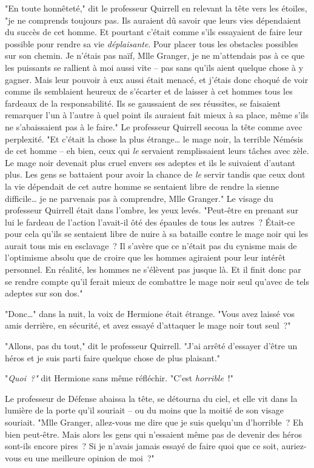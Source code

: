 "En toute honnêteté," dit le professeur Quirrell en relevant la tête vers les étoiles, "je ne comprends toujours pas. Ils auraient dû savoir que leurs vies dépendaient du succès de cet homme. Et pourtant c'était comme s'ils essayaient de faire leur possible pour rendre sa vie \emph{déplaisante}. Pour placer tous les obstacles possibles sur son chemin. Je n'étais pas naïf, Mlle Granger, je ne m'attendais pas à ce que les puissants se rallient à moi aussi vite -- pas sans qu'ils aient quelque chose à y gagner. Mais leur pouvoir à eux aussi était menacé, et j'étais donc choqué de voir comme ils semblaient heureux de s'écarter et de laisser à cet hommes tous les fardeaux de la responsabilité. Ils se gaussaient de ses réussites, se faisaient remarquer l'un à l'autre à quel point ils auraient fait mieux à sa place, même s'ils ne s'abaissaient pas à le faire." Le professeur Quirrell secoua la tête comme avec perplexité. "Et c'était la chose la plus étrange… le mage noir, la terrible Némésis de cet homme -- eh bien, ceux qui \emph{le} servaient remplissaient leurs tâches avec zèle. Le mage noir devenait plus cruel envers ses adeptes et ils le suivaient d'autant plus. Les gens se battaient pour avoir la chance de \emph{le} servir tandis que ceux dont la vie dépendait de cet autre homme se sentaient libre de rendre la sienne difficile… je ne parvenais pas à comprendre, Mlle Granger." Le visage du professeur Quirrell était dans l'ombre, les yeux levés. "Peut-être en prenant sur lui le fardeau de l'action l'avait-il ôté des épaules de tous les autres~? Était-ce pour cela qu'ils se sentaient libre de nuire à sa bataille contre le mage noir qui les aurait tous mis en esclavage~? Il s'avère que ce n'était pas du cynisme mais de l'optimisme absolu que de croire que les hommes agiraient pour leur intérêt personnel. En réalité, les hommes ne s'élèvent pas jusque là. Et il finit donc par se rendre compte qu'il ferait mieux de combattre le mage noir seul qu'avec de tels adeptes sur son dos."

"Donc…" dans la nuit, la voix de Hermione était étrange. "Vous avez laissé vos amis derrière, en sécurité, et avez essayé d'attaquer le mage noir tout seul~?"

"Allons, pas du tout," dit le professeur Quirrell. "J'ai arrêté d'essayer d'être un héros et je suis parti faire quelque chose de plus plaisant."

"\emph{Quoi~?"} dit Hermione sans même réfléchir. "C'est \emph{horrible}~!"

Le professeur de Défense abaissa la tête, se détourna du ciel, et elle vit dans la lumière de la porte qu'il souriait -- ou du moins que la moitié de son visage souriait. "Mlle Granger, allez-vous me dire que je suis quelqu'un d'horrible~? Eh bien peut-être. Mais alors les gens qui n'essaient même pas de devenir des héros sont-ils encore pires~? Si je n'avais jamais essayé de faire quoi que ce soit, auriez-vous eu une meilleure opinion de moi~?"

